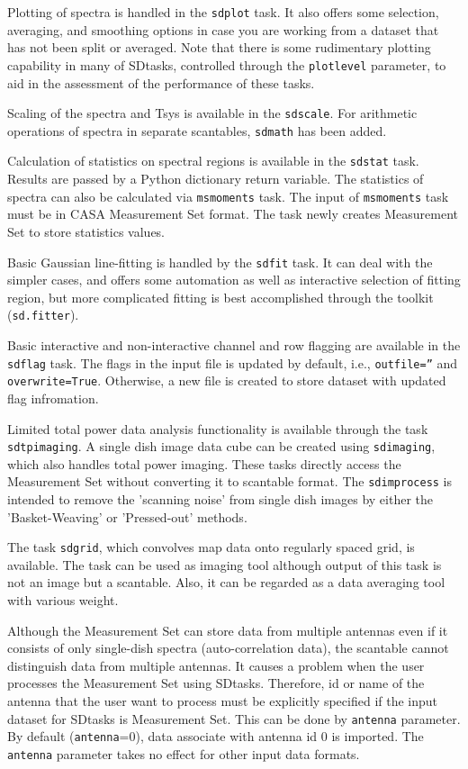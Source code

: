 Plotting of spectra is handled in the {\tt sdplot} task.  It also offers
some selection, averaging, and smoothing options in case you are
working from a dataset that has not been split or averaged.  Note that
there is some rudimentary plotting capability in many of SDtasks, 
controlled through the {\tt plotlevel} parameter, 
to aid in the assessment of the performance of these tasks.

Scaling of the spectra and Tsys is available in the {\tt sdscale}.
For arithmetic operations of spectra in separate scantables, {\tt sdmath}
has been added. 

Calculation of statistics on spectral regions is available in the {\tt sdstat} task.
Results are passed by a Python dictionary return variable.
The statistics of spectra can also be calculated via {\tt msmoments} task.
The input of {\tt msmoments} task must be in CASA Measurement Set format.
The task newly creates Measurement Set to store statistics values.

Basic Gaussian line-fitting is handled by the {\tt sdfit} task.  It can deal
with the simpler cases, and offers some automation as well as interactive 
selection of fitting region, but more complicated
fitting is best accomplished through the toolkit ({\tt sd.fitter}).

Basic interactive and non-interactive channel and row flagging are available 
in the {\tt sdflag} task. 
The flags in the input file is updated by default, i.e., {\tt outfile=''} 
and {\tt overwrite=True}. Otherwise, a new file is created to store dataset
with updated flag infromation.

Limited total power data analysis functionality is available through 
the task {\tt sdtpimaging}. A single dish image data cube can be created
using  {\tt sdimaging}, which also handles total power imaging.
These tasks directly access the Measurement Set without converting it to scantable format.
The {\tt sdimprocess} is intended to remove the 'scanning noise' from single dish
images by either the 'Basket-Weaving' or 'Pressed-out' methods.

The task {\tt sdgrid}, which convolves map data onto regularly 
spaced grid, is available. The task can be used as imaging tool although 
output of this task is not an image but a scantable. Also, it can be 
regarded as a data averaging tool with various weight. 

Although the Measurement Set can store data from multiple antennas
even if it consists of only single-dish spectra (auto-correlation data),
the scantable cannot distinguish data from multiple antennas. It causes
a problem when the user processes the Measurement Set using SDtasks.
Therefore, id or name of the antenna that the user want to process
must be explicitly specified if the input dataset for SDtasks is
Measurement Set. This can be done by {\tt antenna} parameter. By default
({\tt antenna}=0), data associate with antenna id 0 is imported.
The {\tt antenna} parameter takes no effect for other input data formats.

